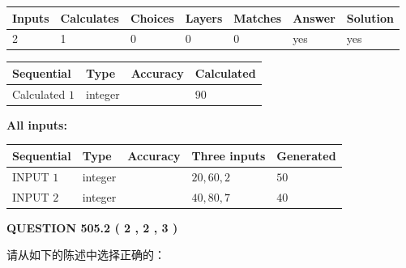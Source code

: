 \documentclass{ctexart}
\begin{document}
 
\noindent{}
 
 

 
   
   
   
   
\noindent\begin{tabular}{|l|l|l|l|l|l|l|}
 \hline
Inputs & Calculates & Choices & Layers & Matches & Answer & Solution \\ \hline
 2  & 
 1  & 
 0
  & 
 0  & 
 0  & 
  yes & 
  yes 
  \\ \hline
 \end{tabular}
   
   
   
   
\noindent{}
   
   
  
  
\noindent\begin{tabular}{|l|l|l|l|}
\hline
 Sequential & Type & Accuracy & Calculated \\ 
\hline
 
 
  Calculated $  1 $ & integer &  & 
  $ 90 $ 
 \\  \hline  
 \end{tabular}
   
   
   
   
\noindent\vspace{0.1in}\hspace{-0.08in} {\textbf{\Large{All inputs: }}}
   
   
  
  
\noindent\begin{tabular}{|l|l|l|l|l|}
\hline
 Sequential & Type & Accuracy & Three inputs & Generated \\ 
\hline
 
 
  INPUT $  1 $ & integer &  & $
 20
 , 
 60
 , 
 2
 $ & $ 50 $ 
 \\  \hline  
 
 
  INPUT $  2 $ & integer &  & $
 40
 , 
 80
 , 
 7
 $ & $ 40 $ 
 \\  \hline  
 \end{tabular}
   
   
  
\vspace{0.2in}
  
{\textbf{\Large{QUESTION
505.2 
 ( 2 , 2 , 3 )
}}}
  
  
请从如下的陈述中选择正确的：
 
\end{document}
